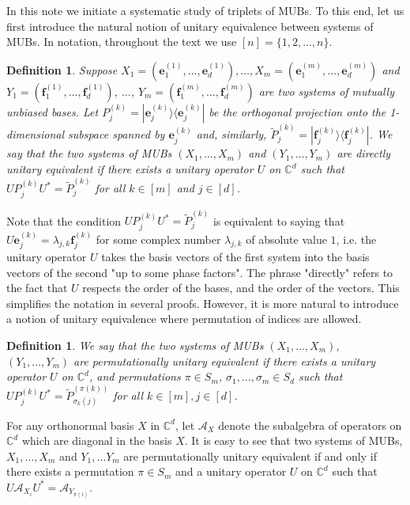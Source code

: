 \documentclass[12pt]{amsart}
\numberwithin{equation}{section}
\newcommand{\s}{\mathfrak{s}}
\newtheorem{defi}[fact]{Definition}
\newenvironment{definition}{\begin{defi} \rm}{\end{defi}}
\theoremstyle{definition}
\theoremstyle{remark}
\newenvironment{remark}
{\par\pushQED{\qed}\renewcommand\qedsymbol{$\diamond$}\nremark \small}
{\popQED\endnremark}
\theoremstyle{remark}
\newcommand{\Co}{\ensuremath{\mathbb{C}}}
\newcommand{\CC}{\ensuremath{\mathbb{C}}}
\def \s {\sigma}
\newcommand{\ac}{\ensuremath{\mathcal{A}}}
\newcommand{\eb}{\ensuremath{\mathbf{e}}}
\newcommand{\fb}{\ensuremath{\mathbf{f}}}
\begin{document}
\medskip

In this note we initiate a systematic study of triplets of MUBs. To this end, let us first introduce the natural notion of unitary equivalence between systems of MUBs. In notation, throughout the text we use $[n]=\{1, 2, \dots, n\}$.

\begin{definition}\label{du}
Suppose $X_1=(\eb^{(1)}_1,\ldots,\eb^{(1)}_d), \dots, X_m=(\eb^{(m)}_1,\ldots,\eb^{(m)}_d)$
 and $Y_1=(\fb^{(1)}_1,\ldots,\fb^{(1)}_d)$, $\dots$, $Y_m=(\fb^{(m)}_1,\ldots,\fb^{(m)}_d)$ are two systems of mutually unbiased bases. Let $P^{(k)}_j=|\eb^{(k)}_j\rangle \langle \eb^{(k)}_j|$ be the orthogonal projection onto the 1-dimensional subspace spanned by $\eb^{(k)}_j$ and, similarly, $\tilde{P}^{(k)}_j=|\fb^{(k)}_j\rangle \langle \fb^{(k)}_j|$.  
 We say that the two systems of MUBs $(X_1, \dots, X_m)$ and $(Y_1, \dots, Y_m)$ are {\it directly unitary equivalent} if there exists a unitary operator $U$ on $\Co^d$ such that $UP^{(k)}_jU^\ast = \tilde{P}^{(k)}_j$ for all $k \in [m]$ and $ j\in [d]$. 
\end{definition}

Note that the condition $UP^{(k)}_jU^\ast = \tilde{P}^{(k)}_j$ is equivalent to saying that $U\eb_j^{(k)}=\lambda_{j,k} \fb_j^{(k)}$ for some complex number $\lambda_{j,k}$ of absolute value $1$, i.e. the unitary operator $U$ takes the basis vectors of the first system into the basis vectors of the second "up to some phase factors". The phrase "directly" refers to the fact that $U$ respects the order of the bases, and the order of the vectors. This simplifies the notation in several proofs. However, it is more natural to introduce a notion of unitary equivalence where permutation of indices are allowed. 

\begin{definition}\label{pu}
We say that the two systems of MUBs $(X_1, \dots, X_m)$, $(Y_1, \dots, Y_m)$ are {\it permutationally unitary equivalent} if there exists a unitary operator $U$ on $\CC^d$, and permutations $\pi\in S_m$, $\s_1, \dots, \s_m\in S_d$ such that $UP^{(k)}_jU^\ast = \tilde{P}^{(\pi(k))}_{\s_k(j)}$ for all $k \in [m], j\in [d]$. 
\end{definition}

\begin{remark}
For any orthonormal basis $X$ in $\CC^d$, let $\ac_X$ denote the subalgebra of operators on $\CC^d$ which are diagonal in the basis $X$. It is easy to see that two systems of MUBs, $X_1, \dots, X_m$
 and $Y_1, \dots Y_m$ are permutationally unitary equivalent if and only if there exists a permutation $\pi\in S_m$ and a unitary operator $U$ on $\CC^d$ such that $U\ac_{X_i}U^\ast =\ac_{Y_{\pi(i)}}$.  
\end{remark}
\end{document}
